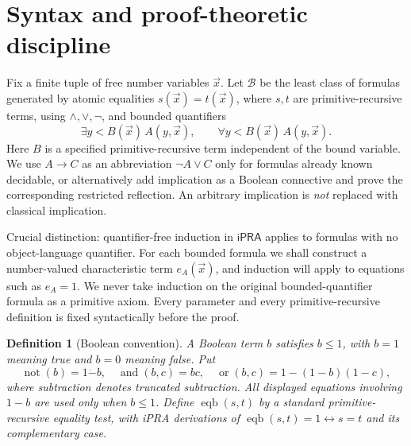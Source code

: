 \documentclass[11pt]{article}
\newtheorem{definition}[theorem]{Definition}
\newcommand{\ipra}{\mathsf{iPRA}}
\newcommand{\bfam}{\mathcal B}
\begin{document}
\section{Syntax and proof-theoretic discipline}
Fix a finite tuple of free number variables $\vec x$. Let $\bfam$ be the least class of formulas generated by atomic equalities $s(\vec x)=t(\vec x)$, where $s,t$ are primitive-recursive terms, using $\wedge,\vee,\neg$, and bounded quantifiers
\[\exists y<B(\vec x)\, A(y,\vec x),\qquad \forall y<B(\vec x)\, A(y,\vec x).\]
Here $B$ is a specified primitive-recursive term independent of the bound variable. We use $A\to C$ as an abbreviation $\neg A\vee C$ only for formulas already known decidable, or alternatively add implication as a Boolean connective and prove the corresponding restricted reflection. An arbitrary implication is \emph{not} replaced with classical implication.

Crucial distinction: quantifier-free induction in $\ipra$ applies to formulas with no object-language quantifier. For each bounded formula we shall construct a number-valued characteristic term $e_A(\vec x)$, and induction will apply to equations such as $e_A=1$. We never take induction on the original bounded-quantifier formula as a primitive axiom. Every parameter and every primitive-recursive definition is fixed syntactically before the proof.

\begin{definition}[Boolean convention]
A Boolean term $b$ satisfies $b\le 1$, with $b=1$ meaning true and $b=0$ meaning false. Put
\[\operatorname{not}(b)=1\mathbin{\dot-} b,\quad \operatorname{and}(b,c)=bc,\quad \operatorname{or}(b,c)=1-(1-b)(1-c),\]
where subtraction denotes truncated subtraction. All displayed equations involving $1-b$ are used only when $b\le1$. Define $\operatorname{eqb}(s,t)$ by a standard primitive-recursive equality test, with iPRA derivations of $\operatorname{eqb}(s,t)=1\leftrightarrow s=t$ and its complementary case.
\end{definition}
\end{document}
